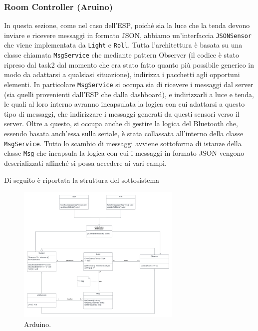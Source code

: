 \documentclass[a4paper,12pt]{report}
\begin{document}
\subsubsection{Room Controller (Aruino)}
In questa sezione, come nel caso dell'ESP, poiché sia la luce che la tenda devono inviare e ricevere messaggi in formato JSON, abbiamo un'interfaccia \texttt{JSONSensor} che viene implementata da \texttt{Light} e \texttt{Roll}.
Tutta l'architettura è basata su una classe chiamata \texttt{MsgService} che mediante pattern Observer (il codice è stato ripreso dal task2 dal momento che era stato fatto quanto più possibile generico in modo da adattarsi a qualsiasi situazione), indirizza i pacchetti agli opportuni elementi. In particolare \texttt{MsgService} si occupa sia di ricevere i messaggi dal server (sia quelli provenienti dall'ESP che dalla dashboard), e indirizzarli a luce e tenda, le quali al loro interno avranno incapsulata la logica con cui adattarsi a questo tipo di messaggi, che indirizzare i messaggi generati da questi sensori verso il server. Oltre a questo, si occupa anche di gestire la logica del Bluetooth che, essendo basata anch'essa sulla seriale, è stata collassata all'interno della classe \texttt{MsgService}.
Tutto lo scambio di messaggi avviene sottoforma di istanze della classe \texttt{Msg} che incapsula la logica con cui i messaggi in formato JSON vengono deserializzati affinché si possa accedere ai vari campi. 

Di seguito è riportata la struttura del sottosistema 
\begin{figure}[H]
    \centering
    \includegraphics[width=0.7\textwidth]{img/Classi - arduino.png}
    \caption{Arduino.}
    \label{fig:arduino}
\end{figure}
\end{document}
